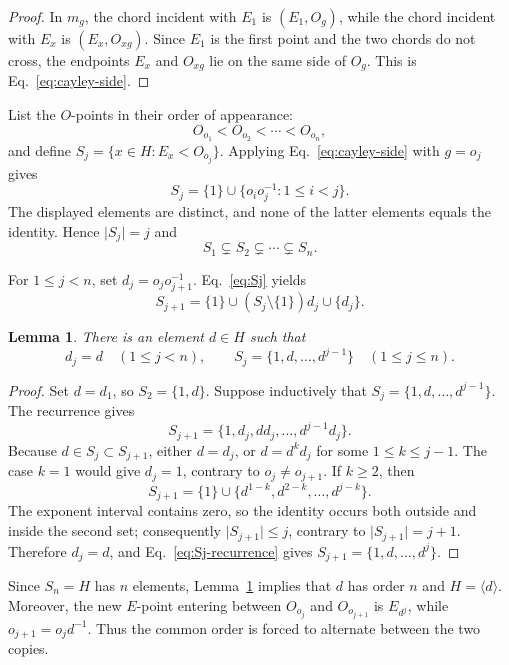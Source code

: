 \documentclass[11pt]{article}
\newtheorem{lemma}[theorem]{Lemma}
\theoremstyle{definition}
\theoremstyle{remark}
\numberwithin{equation}{section}
\begin{document}
\begin{proof}
In \(m_g\), the chord incident with \(E_1\) is
\((E_1,O_g)\), while the chord incident with \(E_x\) is
\((E_x,O_{xg})\).  Since \(E_1\) is the first point and the two chords do
not cross, the endpoints \(E_x\) and \(O_{xg}\) lie on the same side of
\(O_g\).  This is Eq.~\eqref{eq:cayley-side}.
\end{proof}

List the \(O\)-points in their order of appearance:
\[
  O_{o_1}<O_{o_2}<\cdots<O_{o_n},
\]
and define \(S_j=\{x\in H:E_x<O_{o_j}\}\).  Applying
Eq.~\eqref{eq:cayley-side} with \(g=o_j\) gives
\begin{equation}\label{eq:Sj}
  S_j=\{1\}\cup\{o_i o_j^{-1}:1\leq i<j\}.
\end{equation}
The displayed elements are distinct, and none of the latter elements equals
the identity.  Hence \(\lvert S_j\rvert=j\) and
\[
  S_1\subsetneq S_2\subsetneq\cdots\subsetneq S_n.
\]

For \(1\leq j<n\), set \(d_j=o_j o_{j+1}^{-1}\).
Eq.~\eqref{eq:Sj} yields
\begin{equation}\label{eq:Sj-recurrence}
  S_{j+1}
  =
  \{1\}\cup(S_j\setminus\{1\})d_j\cup\{d_j\}.
\end{equation}

\begin{lemma}\label{lem:cayley-generator}
There is an element \(d\in H\) such that
\[
  d_j=d\quad(1\leq j<n),
  \qquad
  S_j=\{1,d,\ldots,d^{j-1}\}\quad(1\leq j\leq n).
\]
\end{lemma}

\begin{proof}
Set \(d=d_1\), so \(S_2=\{1,d\}\).  Suppose inductively that
\(S_j=\{1,d,\ldots,d^{j-1}\}\).  The recurrence gives
\[
  S_{j+1}
  =
  \{1,d_j,dd_j,\ldots,d^{j-1}d_j\}.
\]
Because \(d\in S_j\subset S_{j+1}\), either \(d=d_j\), or
\(d=d^k d_j\) for some \(1\leq k\leq j-1\).  The case \(k=1\) would give
\(d_j=1\), contrary to \(o_j\ne o_{j+1}\).  If \(k\geq2\), then
\[
  S_{j+1}
  =
  \{1\}\cup\{d^{1-k},d^{2-k},\ldots,d^{j-k}\}.
\]
The exponent interval contains zero, so the identity occurs both outside and
inside the second set; consequently \(\lvert S_{j+1}\rvert\leq j\), contrary
to \(\lvert S_{j+1}\rvert=j+1\).  Therefore \(d_j=d\), and
Eq.~\eqref{eq:Sj-recurrence} gives
\(S_{j+1}=\{1,d,\ldots,d^j\}\).
\end{proof}

Since \(S_n=H\) has \(n\) elements, Lemma~\ref{lem:cayley-generator}
implies that \(d\) has order \(n\) and \(H=\langle d\rangle\).  Moreover,
the new \(E\)-point entering between \(O_{o_j}\) and \(O_{o_{j+1}}\) is
\(E_{d^j}\), while \(o_{j+1}=o_jd^{-1}\).  Thus the common order is forced
to alternate between the two copies.
\end{document}
